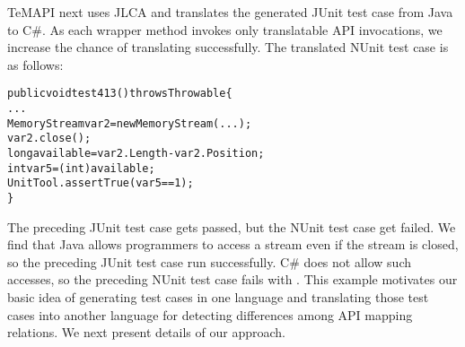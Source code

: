 TeMAPI next uses JLCA and translates the generated JUnit test case from Java to C\#. As each wrapper method invokes only translatable API invocations, we increase the chance of translating successfully. The translated NUnit test case is as follows:

\begin{CodeOut}\vspace*{-1ex}
\begin{alltt}
public void test413() throws Throwable\{
  ...
  MemoryStream var2 = new MemoryStream(...);
  var2.close();
  long available = var2.Length - var2.Position;
  int var5 = (int) available;
  UnitTool.assertTrue(var5 == 1);
\}
\end{alltt}
\end{CodeOut}\vspace*{-2ex}

The preceding JUnit test case gets passed, but the NUnit test case get failed. We find that Java allows programmers to access a stream even if the stream is closed, so the preceding JUnit test case run successfully. C\# does not allow such accesses, so the preceding NUnit test case fails with . This example motivates our basic idea of generating test cases in one language and translating those test cases into another language for detecting differences among API mapping relations. We next present details of our approach.



